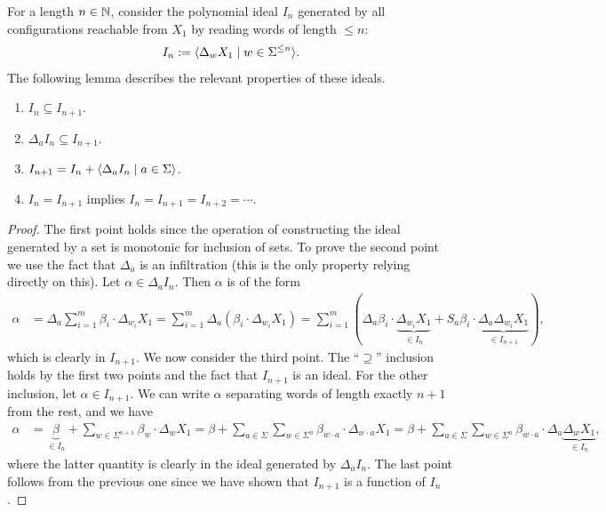 For a length $n \in \mathbb N$,
consider the polynomial ideal $I_n$
generated by all configurations reachable from $X_1$
by reading words of length $\leq n$:
%
\begin{align*}
    I_n := \langle\Delta_w X_1 \mid w \in \Sigma^{\leq n}\rangle.
\end{align*}
%
The following lemma describes the relevant properties of these ideals.
%
\begin{lemma}
    \label{lem:infiltration ideals}
    \begin{enumerate}
        \item $I_n \subseteq I_{n+1}$.
        \item $\Delta_a I_n \subseteq I_{n+1}$.
        \item $I_{n+1} = I_n + \langle\Delta_a I_n \mid a \in \Sigma\rangle$.
        \item $I_n = I_{n+1}$ implies $I_n = I_{n+1} = I_{n+2} = \cdots$.
    \end{enumerate}
\end{lemma}
\begin{proof}
    The first point holds since the operation of constructing the ideal generated by a set
    is monotonic for inclusion of sets.
    To prove the second point we use the fact that $\Delta_a$ is an infiltration
    (this is the only property relying directly on this).
    Let $\alpha \in \Delta_a I_n$. Then $\alpha$ is of the form
    \begin{align*}
        \alpha
        &= \Delta_a \sum_{i = 1}^m \beta_i \cdot \Delta_{w_i} X_1
        = \sum_{i = 1}^m \Delta_a (\beta_i \cdot \Delta_{w_i} X_1)
        = \sum_{i = 1}^m (\Delta_a \beta_i \cdot \underbrace{\Delta_{w_i} X_1}_{\in I_n}
            + S_a \beta_i \cdot \underbrace{\Delta_a \Delta_{w_i} X_1}_{\in I_{n+1}}),
    \end{align*}
    which is clearly in $I_{n+1}$.
    We now consider the third point.
    The ``$\supseteq$'' inclusion holds by the first two points
    and the fact that $I_{n+1}$ is an ideal.
    For the other inclusion, let $\alpha \in I_{n+1}$.
    We can write $\alpha$ separating words of length exactly $n+1$ from the rest, and we have
    \begin{align*}
        \alpha
            &= \underbrace \beta_{\in I_n}
            + \sum_{w \in \Sigma^{n+1}} \beta_w \cdot \Delta_w X_1
            = \beta + \sum_{a \in \Sigma} \sum_{w \in \Sigma^n} \beta_{w \cdot a} \cdot \Delta_{w \cdot a} X_1
            = \beta + \sum_{a \in \Sigma} \sum_{w \in \Sigma^n} \beta_{w \cdot a} \cdot \Delta_a \underbrace{\Delta_w X_1}_{\in I_n},
    \end{align*}
    where the latter quantity is clearly in the ideal generated by $\Delta_a I_n$.
    The last point follows from the previous one
    since we have shown that $I_{n+1}$ is a function of $I_n$.
\end{proof}

